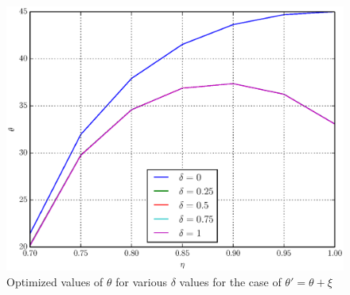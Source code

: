 \documentclass[%
master,         %
subf,           %
href,           %
colorlinks=true %
]{disser}
\numberwithin{equation}{section}
\numberwithin{figure}{section}
\begin{document}
\begin{figure}[h]
\includegraphics[scale=0.7]{theta_ang.eps}
\caption{Optimized values of $\theta$ for various $\delta$ values for the case of $\theta' = \theta + \xi$}
\label{fig:theta_ang}
\end{figure}
\end{document}
